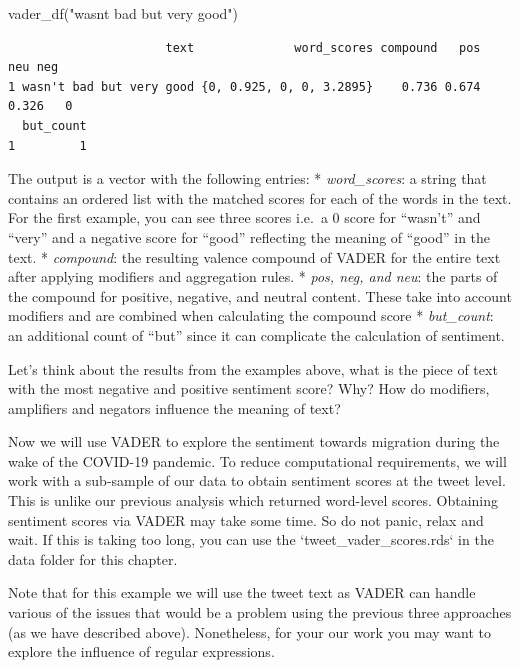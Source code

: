 \documentclass[
  letterpaper,
  DIV=11,
  numbers=noendperiod]{scrreprt}
\newenvironment{Shaded}{\begin{snugshade}}{\end{snugshade}}
\newcommand{\FunctionTok}[1]{\textcolor[rgb]{0.28,0.35,0.67}{#1}}
\newcommand{\NormalTok}[1]{\textcolor[rgb]{0.00,0.23,0.31}{#1}}
\newcommand{\StringTok}[1]{\textcolor[rgb]{0.13,0.47,0.30}{#1}}
\begin{document}
\begin{Shaded}
\begin{Highlighting}[]
\FunctionTok{vader\_df}\NormalTok{(}\StringTok{"wasn\textquotesingle{}t bad but very good"}\NormalTok{)}
\end{Highlighting}
\end{Shaded}

\begin{verbatim}
                      text              word_scores compound   pos   neu neg
1 wasn't bad but very good {0, 0.925, 0, 0, 3.2895}    0.736 0.674 0.326   0
  but_count
1         1
\end{verbatim}

The output is a vector with the following entries: *
\emph{word\_scores}: a string that contains an ordered list with the
matched scores for each of the words in the text. For the first example,
you can see three scores i.e.~a 0 score for ``wasn't'' and ``very'' and
a negative score for ``good'' reflecting the meaning of ``good'' in the
text. * \emph{compound}: the resulting valence compound of VADER for the
entire text after applying modifiers and aggregation rules. * \emph{pos,
neg, and neu}: the parts of the compound for positive, negative, and
neutral content. These take into account modifiers and are combined when
calculating the compound score * \emph{but\_count}: an additional count
of ``but'' since it can complicate the calculation of sentiment.

Let's think about the results from the examples above, what is the piece
of text with the most negative and positive sentiment score? Why? How do
modifiers, amplifiers and negators influence the meaning of text?

Now we will use VADER to explore the sentiment towards migration during
the wake of the COVID-19 pandemic. To reduce computational requirements,
we will work with a sub-sample of our data to obtain sentiment scores at
the tweet level. This is unlike our previous analysis which returned
word-level scores. Obtaining sentiment scores via VADER may take some
time. So do not panic, relax and wait. If this is taking too long, you
can use the `tweet\_vader\_scores.rds` in the data folder for this
chapter.

Note that for this example we will use the tweet text as VADER can
handle various of the issues that would be a problem using the previous
three approaches (as we have described above). Nonetheless, for your our
work you may want to explore the influence of regular expressions.
\end{document}
